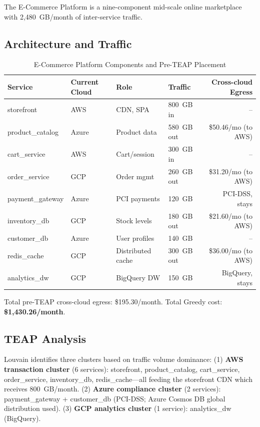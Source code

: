 \documentclass[10pt,journal]{IEEEtran}
\begin{document}
The E-Commerce Platform is a nine-component mid-scale online marketplace with
2,480~GB/month of inter-service traffic.

\subsection{Architecture and Traffic}

\begin{table}[ht]
\centering
\caption{E-Commerce Platform Components and Pre-TEAP Placement}
\label{tab:ecommerce_specs}
\setlength{\tabcolsep}{3.5pt}
\begin{tabular}{llllr}
\toprule
Service & Current Cloud & Role & Traffic & Cross-cloud Egress\\
\midrule
storefront       & AWS   & CDN, SPA      & 800~GB in & --\\
product\_catalog & Azure & Product data  & 580~GB out& \$50.46/mo (to AWS)\\
cart\_service    & AWS   & Cart/session  & 300~GB in & --\\
order\_service   & GCP   & Order mgmt    & 260~GB out& \$31.20/mo (to AWS)\\
payment\_gateway & Azure & PCI payments  & 120~GB    & PCI-DSS, stays\\
inventory\_db    & GCP   & Stock levels  & 180~GB out& \$21.60/mo (to AWS)\\
customer\_db     & Azure & User profiles & 140~GB    & --\\
redis\_cache     & GCP   & Distributed cache & 300~GB out& \$36.00/mo (to AWS)\\
analytics\_dw    & GCP   & BigQuery DW   & 150~GB    & BigQuery, stays\\
\bottomrule
\end{tabular}
\end{table}

Total pre-TEAP cross-cloud egress: \$195.30/month.
Total Greedy cost: \textbf{\$1,430.26/month}.

\subsection{TEAP Analysis}

Louvain identifies three clusters based on traffic volume dominance:
(1) \textbf{AWS transaction cluster} (6 services): storefront, product\_catalog,
cart\_service, order\_service, inventory\_db, redis\_cache---all feeding the
storefront CDN which receives 800~GB/month.
(2) \textbf{Azure compliance cluster} (2 services): payment\_gateway + customer\_db
(PCI-DSS; Azure Cosmos DB global distribution used).
(3) \textbf{GCP analytics cluster} (1 service): analytics\_dw (BigQuery).
\end{document}
